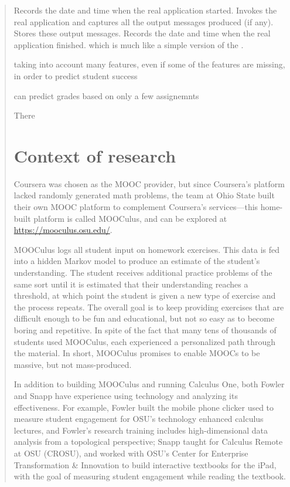 \documentclass[12pt]{article}
\begin{document}
\begin{quote}
Records the date and time when the real application started.
Invokes the real application and captures all the output messages produced (if any).
Stores these output messages.
Records the date and time when the real application finished.
\parencite{RomeroZaldivar20121058} 
which is much like a simple version of the \parencite{tin-can-api}.


taking into account many features, even if some of the features are
missing, in order to predict student
success \parencite{Zafra201115020}

can predict grades based on only a few assignemnts \parencite{predict-grades}


There 



\section{Context of research}

Coursera was chosen as the MOOC provider, but since Coursera's
platform lacked randomly generated math problems, the team at Ohio
State built their own MOOC platform to complement Coursera's
services---this home-built platform is called MOOCulus, and can be
explored at \url{https://mooculus.osu.edu/}.

MOOCulus logs all student input on homework exercises. This data is
fed into a hidden Markov model to produce an estimate of the student's
understanding. The student receives additional practice problems of
the same sort until it is estimated that their understanding reaches a
threshold, at which point the student is given a new type of exercise
and the process repeats.  The overall goal is to keep providing
exercises that are difficult enough to be fun and educational, but not
so easy as to become boring and repetitive.  In spite of the fact that
many tens of thousands of students used MOOCulus, each experienced a
personalized path through the material.  In short, MOOCulus promises
to enable MOOCs to be massive, but not mass-produced.

In addition to building MOOCulus and running Calculus One, both Fowler
and Snapp have experience using technology and analyzing its
effectiveness.  For example, Fowler built the mobile phone clicker
used to measure student engagement for OSU's technology enhanced
calculus lectures, and Fowler's research training includes
high-dimensional data analysis from a topological perspective; Snapp
taught for Calculus Remote at OSU (CROSU), and worked with OSU's
Center for Enterprise Transformation \& Innovation to build
interactive textbooks for the iPad, with the goal of measuring student
engagement while reading the textbook.


\end{quote}
\end{document}
